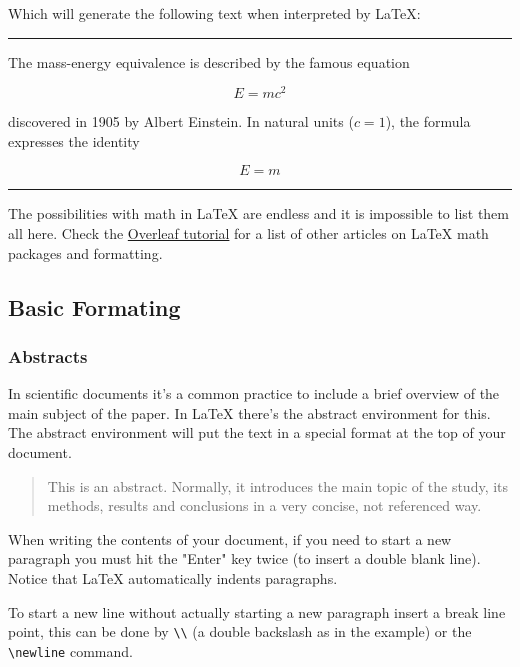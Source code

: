 \documentclass[12pt]{article}
\begin{document}
\begin{minipage}{\linewidth}

Which will generate the following text when interpreted by \LaTeX{}:\bigskip

\hrule\bigskip
The mass-energy equivalence is described by the famous equation

\[ E=mc^2 \]

discovered in 1905 by Albert Einstein. 
In natural units ($c = 1$), the formula expresses the identity

\begin{equation}
E=m
\end{equation}
\hrule
\end{minipage}\bigskip

The possibilities with math in \LaTeX{} are endless and it is impossible to list them all here. Check the \href{https://www.overleaf.com/learn/latex/Learn_LaTeX_in_30_minute}{Overleaf tutorial} for a list of other articles on \LaTeX{} math packages and formatting.

\subsection{Basic Formating}

\subsubsection{Abstracts}

In scientific documents it's a common practice to include a brief overview of the main subject of the paper. In LaTeX there's the abstract environment for this. The abstract environment will put the text in a special format at the top of your document. 

\begin{abstract}
    \noindent This is an abstract. Normally, it introduces the main topic of the study, its methods, results and conclusions in a very concise, not referenced way.\centering
\end{abstract}

When writing the contents of your document, if you need to start a new paragraph you must hit the "Enter" key twice (to insert a double blank line). Notice that LaTeX automatically indents paragraphs.

To start a new line without actually starting a new paragraph insert a break line point, this can be done by \verb+\\+ (a double backslash as in the example) or the \verb+\newline+ command.
\end{document}
